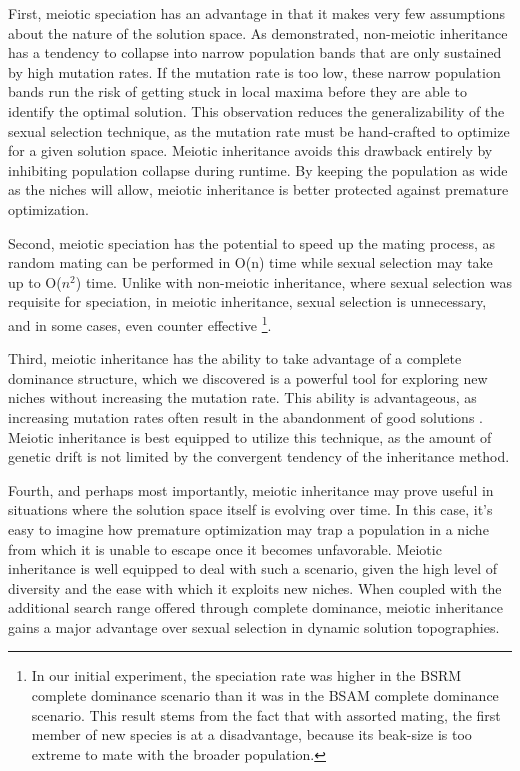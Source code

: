 \documentclass[conference]{IEEEtran}
\begin{document}
First, meiotic speciation has an advantage in that it makes very few assumptions about the nature of the solution space. As demonstrated, non-meiotic inheritance has a tendency to collapse into narrow population bands that are only sustained by high mutation rates. If the mutation rate is too low, these narrow population bands run the risk of getting stuck in local maxima before they are able to identify the optimal solution. This observation reduces the generalizability of the sexual selection technique, as the mutation rate must be hand-crafted to optimize for a given solution space. Meiotic inheritance avoids this drawback entirely by inhibiting population collapse during runtime. By keeping the population as wide as the niches will allow, meiotic inheritance is better protected against premature optimization.

Second, meiotic speciation has the potential to speed up the mating process, as random mating can be performed in O(n) time while sexual selection may take up to O($n^2$) time. Unlike with non-meiotic inheritance, where sexual selection was requisite for speciation, in meiotic inheritance, sexual selection is unnecessary, and in some cases, even counter effective \footnote{In our initial experiment, the speciation rate was higher in the BSRM complete dominance scenario than it was in the BSAM complete dominance scenario. This result stems from the fact that with assorted mating, the first member of new species is at a disadvantage, because its beak-size is too extreme to mate with the broader population.}. 

Third, meiotic inheritance has the ability to take advantage of a complete dominance structure, which we discovered is a powerful tool for exploring new niches without increasing the mutation rate. This ability is advantageous, as increasing mutation rates often result in the abandonment of good solutions \cite{TAGGING}. Meiotic inheritance is best equipped to utilize this technique, as the amount of genetic drift is not limited by the convergent tendency of the inheritance method.

Fourth, and perhaps most importantly, meiotic inheritance may prove useful in situations where the solution space itself is evolving over time. In this case, it's easy to imagine how premature optimization may trap a population in a niche from which it is unable to escape once it becomes unfavorable. Meiotic inheritance is well equipped to deal with such a scenario, given the high level of diversity and the ease with which it exploits new niches. When coupled with the additional search range offered through complete dominance, meiotic inheritance gains a major advantage over sexual selection in dynamic solution topographies. 
\end{document}
